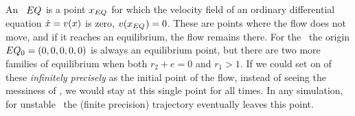 \subsection{\Eqva}

An \eqv\ $EQ_{}$ is a point $x_{EQ_{}}$ for which the
velocity field of an ordinary differential equation
$\dot{x} = v(x)$ is zero, $v(x_{EQ_{}})=0$. These
are points where the flow does not move, and if it reaches an
equilibrium, the flow remains there. For the \cLe\, the
origin $EQ_{0}=(0, 0, 0, 0, 0)$ is always an equilibrium
point, but there are two more families of equilibrium when
both $r_2 + e=0$ and $r_1>1$. If we could set on of these
{\em infinitely precisely} as the initial point of the flow,
instead of seeing the messiness of , we
would stay at this single point for all times. In any
simulation, for unstable \reqv\ the (finite precision)
trajectory eventually leaves this point.



